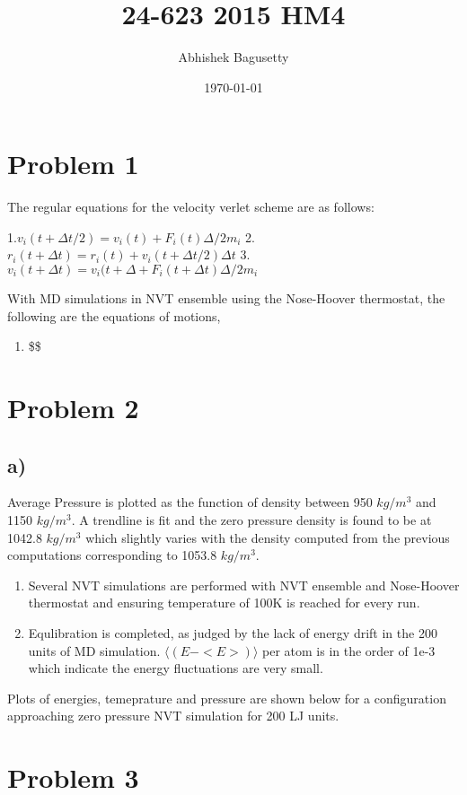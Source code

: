\documentclass{article}
\author{Abhishek Bagusetty}
\date{\today}
\title{24-623 2015 HM4}
\begin{document}
\maketitle

\section{Problem 1}
\label{sec-1}
The regular equations for the velocity verlet scheme are as follows: 

1.$v_{i}(t+\Delta t/2) = v_{i}(t) + F_{i}(t) \Delta/2m_{i}$
2.$r_{i}(t+\Delta t) = r_{i}(t) + v_{i}(t+\Delta t/2)\Delta t$
3.$v_{i}(t+\Delta t) = v_{i}(t+\Delta + F_{i}(t+\Delta t) \Delta/2m_{i}$

With MD simulations in NVT ensemble using the Nose-Hoover thermostat, the following are the equations of motions,

\begin{enumerate}
\item \$\$
\end{enumerate}
\section{Problem 2}
\label{sec-2}
\subsection{a)}
\label{sec-2-1}

Average Pressure is plotted as the function of density between 950 $kg/m^3$ and 1150 $kg/m^3$. A trendline is fit and the zero pressure density is found to be at 1042.8 $kg/m^3$ which slightly varies with the density computed from the previous computations corresponding to 1053.8 $kg/m^3$.

\begin{enumerate}
\item Several NVT simulations are performed with NVT ensemble and Nose-Hoover thermostat and ensuring temperature of 100K is reached for every run.

\item Equlibration is completed, as judged by the lack of energy drift in the 200 units of MD simulation. $\big\langle (E-<E>) \big\rangle$ per atom is in the order of 1e-3 which indicate the energy fluctuations are very small.
\end{enumerate}

Plots of energies, temeprature and pressure are shown below for a configuration approaching zero pressure NVT simulation for 200 LJ units.


\section{Problem 3}
\label{sec-3}
\end{document}
